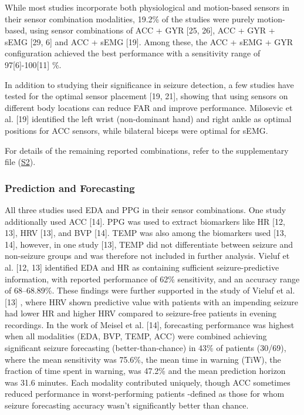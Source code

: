 While most studies incorporate both physiological and motion-based sensors in their sensor combination modalities, 19.2\% of the studies were purely motion-based, using sensor combinations of ACC + GYR [25, 26], ACC + GYR + sEMG [29, 6] and ACC + sEMG [19]. Among these, the ACC + sEMG + GYR configuration achieved the best performance with a sensitivity range of 97[6]-100[11] \%.    

In addition to studying their significance in seizure detection, a few studies have tested for the optimal sensor placement [19, 21], showing that using sensors on different body locations can reduce FAR and improve performance. Milosevic et al. [19] identified the left wrist (non-dominant hand) and right ankle as optimal positions for ACC sensors, while bilateral biceps were optimal for sEMG.

For details of the remaining reported combinations, refer to the supplementary file (\href{https://docs.google.com/spreadsheets/d/1FjxwkHFbNDM84nuqg513gR_0vIVql-evoT1EMiqSYZU/edit?pli=1&gid=1893827577#gid=1893827577}{S2}).

\subsubsection{Prediction and Forecasting}
All three studies used EDA and PPG in their sensor combinations. One study additionally used ACC [14]. PPG was used to extract biomarkers like HR [12, 13], HRV [13], and BVP [14]. TEMP was also among the biomarkers used [13, 14], however, in one study [13], TEMP did not differentiate between seizure and non-seizure groups and was therefore not included in further analysis. Vieluf et al. [12, 13] identified EDA and HR as containing sufficient seizure-predictive information, with reported performance of 62\% sensitivity, and an accuracy range of 68–68.89\%. These findings were further supported in the study of Vieluf et al. [13] , where HRV shown predictive value with patients with an impending seizure had lower HR and higher HRV compared to seizure-free patients in evening recordings. In the work of Meisel et al. [14],  forecasting performance was highest when all modalities (EDA, BVP, TEMP, ACC) were combined achieving significant seizure forecasting (better-than-chance) in 43\% of patients (30/69), where the mean sensitivity was 75.6\%, the mean time in warning (TiW), the fraction of time spent in warning,  was 47.2\% and the mean prediction horizon was 31.6 minutes. Each modality contributed uniquely, though ACC sometimes reduced performance in worst-performing  patients -defined as those for whom seizure forecasting accuracy wasn’t significantly better than chance.
